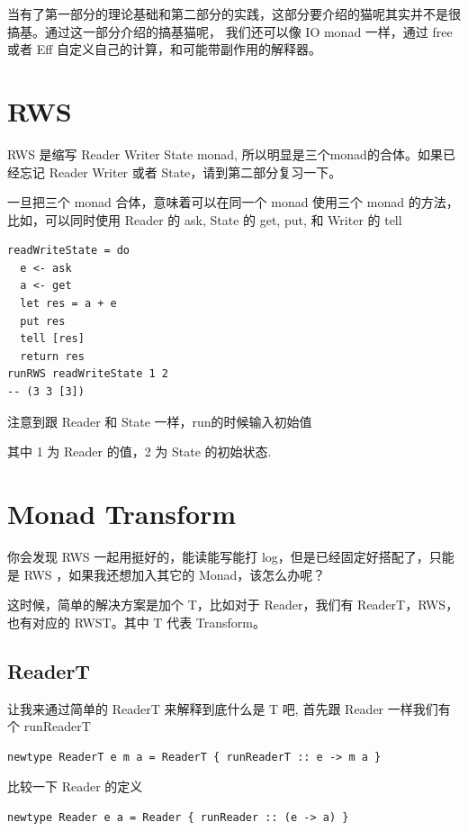 \documentclass[letterspacing]{tufte-book}
\begin{document}
当有了第一部分的理论基础和第二部分的实践，这部分要介绍的猫呢其实并不是很搞基。通过这一部分介绍的搞基猫呢，
我们还可以像 IO monad 一样，通过 free 或者 Eff 自定义自己的计算，和可能带副作用的解释器。

\chapter{RWS}
\label{sec:orgbdde1ab}
RWS 是缩写 Reader Writer State monad, 所以明显是三个monad的合体。如果已经忘记 Reader Writer 或者 State，请到第二部分复习一下。

一旦把三个 monad 合体，意味着可以在同一个 monad 使用三个 monad 的方法，比如，可以同时使用 Reader 的 ask, State 的 get, put, 和 Writer 的 tell

\lstset{language=haskell,label= ,caption= ,captionpos=b,numbers=none}
\begin{lstlisting}
readWriteState = do
  e <- ask
  a <- get
  let res = a + e
  put res
  tell [res]
  return res
runRWS readWriteState 1 2
-- (3 3 [3])
\end{lstlisting}

注意到跟 Reader 和 State 一样，run的时候输入初始值

其中 1 为 Reader 的值，2 为 State 的初始状态.

\chapter{Monad Transform}
\label{sec:orgcb320a6}

你会发现 RWS 一起用挺好的，能读能写能打 log，但是已经固定好搭配了，只能是 RWS ，如果我还想加入其它的 Monad，该怎么办呢？

这时候，简单的解决方案是加个 T，比如对于 Reader，我们有 ReaderT，RWS，也有对应的 RWST。其中 T 代表 Transform。

\section{ReaderT}
\label{sec:org6fd5901}

让我来通过简单的 ReaderT 来解释到底什么是 T 吧, 首先跟 Reader 一样我们有个 runReaderT

\lstset{language=haskell,label= ,caption= ,captionpos=b,numbers=none}
\begin{lstlisting}
newtype ReaderT e m a = ReaderT { runReaderT :: e -> m a }
\end{lstlisting}

比较一下 Reader 的定义
\lstset{language=haskell,label= ,caption= ,captionpos=b,numbers=none}
\begin{lstlisting}
newtype Reader e a = Reader { runReader :: (e -> a) }
\end{lstlisting}
\end{document}
